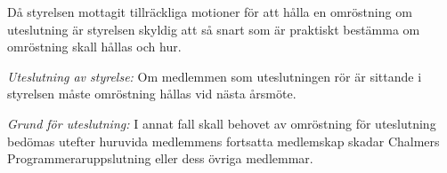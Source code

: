 \documentclass[a4paper]{article}
\def\CPU{Chalmers Programmeraruppslutning\xspace}
\begin{document}
Då styrelsen mottagit tillräckliga motioner för att hålla en omröstning om uteslutning är styrelsen skyldig att så snart som är praktiskt bestämma om omröstning skall hållas och hur.

\emph{Uteslutning av styrelse:} Om medlemmen som uteslutningen rör är sittande i styrelsen måste omröstning hållas vid nästa årsmöte.

\emph{Grund för uteslutning:} I annat fall skall behovet av omröstning för uteslutning bedömas utefter huruvida medlemmens fortsatta medlemskap skadar \CPU eller dess övriga medlemmar.

\end{document}
